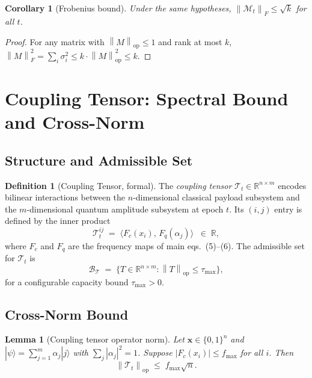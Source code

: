 \documentclass[12pt,letterpaper]{article}
\theoremstyle{plain}
\newtheorem{lemma}[theorem]{Lemma}
\newtheorem{corollary}[theorem]{Corollary}
\theoremstyle{definition}
\newtheorem{definition}[theorem]{Definition}
\newcommand{\M}{\mathcal{M}}
\newcommand{\T}{\mathcal{T}}
\newcommand{\calB}{\mathcal{B}}
\newcommand{\opnorm}[1]{\left\|#1\right\|_{\mathrm{op}}}
\newcommand{\frnorm}[1]{\left\|#1\right\|_{F}}
\newcommand{\R}{\mathbb{R}}
\begin{document}
\begin{corollary}[Frobenius bound]
\label{cor:frob_bound}
Under the same hypotheses,
\(\frnorm{\M_t} \leq \sqrt{k}\) for all \(t\).
\end{corollary}
\begin{proof}
For any matrix with \(\opnorm{M}\leq 1\) and rank at most \(k\),
\(\frnorm{M}^2 = \sum_i \sigma_i^2 \leq k\cdot\opnorm{M}^2 \leq k\).
\end{proof}

\section{Coupling Tensor: Spectral Bound and Cross-Norm}
\label{app:coupling}

\subsection{Structure and Admissible Set}

\begin{definition}[Coupling Tensor, formal]
\label{def:T_formal}
The \emph{coupling tensor} \(\T_t \in \R^{n \times m}\) encodes
bilinear interactions between the \(n\)-dimensional classical payload
subsystem and the \(m\)-dimensional quantum amplitude subsystem at epoch
\(t\).  Its \((i,j)\) entry is defined by the inner product
\[
  \T_t^{ij} \;=\; \langle F_c(x_i),\, F_q(\alpha_j) \rangle
  \;\;\in\;\R,
\]
where \(F_c\) and \(F_q\) are the frequency maps of main eqs.~(5)--(6).
The admissible set for \(\T_t\) is
\[
  \calB_{\T} \;=\;
  \bigl\{T \in \R^{n\times m} : \opnorm{T} \leq \tau_{\max} \bigr\},
\]
for a configurable capacity bound \(\tau_{\max} > 0\).
\end{definition}

\subsection{Cross-Norm Bound}

\begin{lemma}[Coupling tensor operator norm]
\label{lem:T_opnorm}
Let \(\mathbf{x} \in \{0,1\}^n\) and
\(|\psi\rangle = \sum_{j=1}^m \alpha_j |j\rangle\) with
\(\sum_j |\alpha_j|^2 = 1\).
Suppose \(|F_c(x_i)| \leq f_{\max}\) for all \(i\).
Then
\[
  \opnorm{\T_t} \;\leq\; f_{\max}\sqrt{n}.
\]
\end{lemma}
\end{document}
